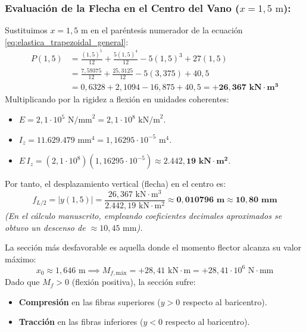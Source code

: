 \subsubsection*{Evaluación de la Flecha en el Centro del Vano ($x = 1{,}5\text{ m}$):}
Sustituimos $x = 1{,}5\text{ m}$ en el paréntesis numerador de la ecuación \eqref{eq:elastica_trapezoidal_general}:
\begin{align}
    P(1{,}5) & = \frac{(1{,}5)^5}{12} + \frac{5(1{,}5)^4}{12} - 5(1{,}5)^3 + 27(1{,}5) \nonumber \\
             & = \frac{7{,}59375}{12} + \frac{25{,}3125}{12} - 5(3{,}375) + 40{,}5 \nonumber \\
             & = 0{,}6328 + 2{,}1094 - 16{,}875 + 40{,}5 = \mathbf{+26{,}367\text{ kN}\cdot\text{m}^3}
\end{align}
Multiplicando por la rigidez a flexión en unidades coherentes:
\begin{itemize}
    \item $E = 2{,}1 \cdot 10^5\text{ N/mm}^2 = 2{,}1 \cdot 10^8\text{ kN/m}^2$.
    \item $I_z = 11.629.479\text{ mm}^4 = 1{,}16295 \cdot 10^{-5}\text{ m}^4$.
    \item $E\,I_z = (2{,}1 \cdot 10^8)(1{,}16295 \cdot 10^{-5}) \approx \mathbf{2.442{,}19\text{ kN}\cdot\text{m}^2}$.
\end{itemize}
Por tanto, el desplazamiento vertical (flecha) en el centro es:
\begin{equation}
    \boxed{f_{L/2} = |y(1{,}5)| = \frac{26{,}367\text{ kN}\cdot\text{m}^3}{2.442{,}19\text{ kN}\cdot\text{m}^2} \approx \mathbf{0{,}010796\text{ m} \approx 10{,}80\text{ mm}}}
\end{equation}
\textit{(En el cálculo manuscrito, empleando coeficientes decimales aproximados se obtuvo un descenso de $\approx 10{,}45\text{ mm}$).}


La sección más desfavorable es aquella donde el momento flector alcanza su valor máximo:
\begin{equation}
    x_0 \approx 1{,}646\text{ m} \implies M_{f,\text{máx}} = +28{,}41\text{ kN}\cdot\text{m} = +28{,}41 \cdot 10^6\text{ N}\cdot\text{mm}
\end{equation}
Dado que $M_f > 0$ (flexión positiva), la sección sufre:
\begin{itemize}
    \item \textbf{Compresión} en las fibras superiores ($y > 0$ respecto al baricentro).
    \item \textbf{Tracción} en las fibras inferiores ($y < 0$ respecto al baricentro).
\end{itemize}

